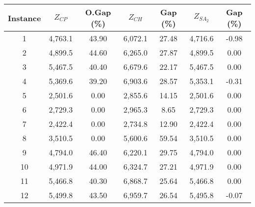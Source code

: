 \documentclass[11pt]{article}
\begin{document}
\begin{table}[H]
    \footnotesize
    \centering
\begin{tabular}{@{}ccccccc@{}}
\toprule
Instance & $Z_{CP}$      & O.Gap (\%) & $Z_{CH}$                 & Gap (\%)      & $Z_{SA_2}$  & Gap (\%) \\ \midrule
\multicolumn{1}{c|}{1}        & 4,763.1       & 43.90      & 6,072.1                   & 27.48          & 4,716.6     & -0.98    \\
\multicolumn{1}{c|}{2}        & 4,899.5       & 44.60      & 6,265.0                   & 27.87          & 4,899.5     & 0.00        \\
\multicolumn{1}{c|}{3}        & 5,467.5       & 40.40      & 6,679.6                   & 22.17          & 5,467.5     & 0.00        \\
\multicolumn{1}{c|}{4}        & 5,369.6       & 39.20      & 6,903.6                   & 28.57          & 5,353.1     & -0.31    \\
\multicolumn{1}{c|}{5}        & 2,501.6       & 0.00      & 2,855.6                   & 14.15          & 2,501.6     & 0.00        \\
\multicolumn{1}{c|}{6}        & 2,729.3       & 0.00      & 2,965.3                   & 8.65          & 2,729.3     & 0.00        \\
\multicolumn{1}{c|}{7}        & 2,422.4       & 0.00      & 2,734.8                   & 12.90          & 2,422.4     & 0.00        \\
\multicolumn{1}{c|}{8}        & 3,510.5       & 0.00      & 5,600.6                   & 59.54          & 3,510.5     & 0.00        \\
\multicolumn{1}{c|}{9}        & 4,794.0       & 46.40      & 6,220.1                   & 29.75          & 4,794.0     & 0.00        \\
\multicolumn{1}{c|}{10}       & 4,971.9       & 44.00      & 6,324.7                   & 27.21          & 4,971.9     & 0.00        \\
\multicolumn{1}{c|}{11}       & 5,466.8       & 40.30      & 6,868.7                   & 25.64          & 5,466.8     & 0.00        \\
\multicolumn{1}{c|}{12}       & 5,499.8       & 43.50      & 6,959.7                   & 26.54          & 5,495.8     & -0.07    \\

\end{tabular}
\end{table}
\end{document}
